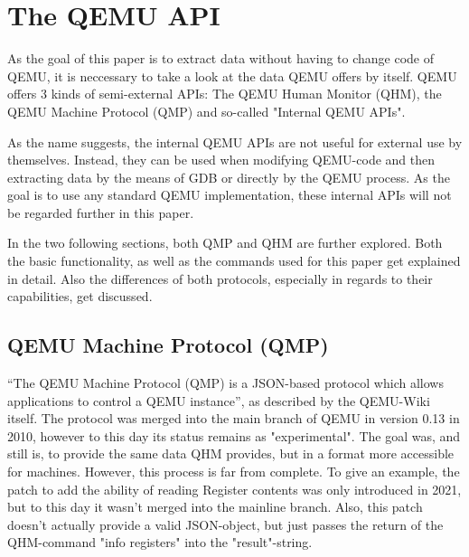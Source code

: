 
\chapter{The QEMU API} \label{chap:QEMU_API}
As the goal of this paper is to extract data without having to change code of QEMU,
it is neccessary to take a look at the data QEMU offers by itself.
QEMU offers 3 kinds of semi-external APIs: The QEMU Human Monitor (QHM),
the QEMU Machine Protocol (QMP) and so-called "Internal QEMU APIs"\cite{internal}.

As the name suggests, the internal QEMU APIs are not useful for external use by themselves.
Instead, they can be used when modifying QEMU-code and then extracting data by the means of GDB or directly by the QEMU process.
As the goal is to use any standard QEMU implementation, these internal APIs will not be regarded further in this paper.

In the two following sections, both QMP and QHM are further explored. Both the basic functionality,
as well as the commands used for this paper get explained in detail.
Also the differences of both protocols, especially in regards to their capabilities,
get discussed.

\section{QEMU Machine Protocol (QMP)} \label{sec:QMP}
\enquote{The QEMU Machine Protocol (QMP) is a JSON-based protocol which allows applications to control a QEMU instance}\cite{qmp-description}, as described by the QEMU-Wiki itself.
The protocol was merged into the main branch of QEMU in version 0.13 in 2010, however to this day its status remains as "experimental"\cite{qmp-merge}.
The goal was, and still is, to provide the same data QHM provides, but in a format more accessible for machines.
However, this process is far from complete. To give an example, the patch to add the ability of reading Register contents was only introduced in 2021,
but to this day it wasn't merged into the mainline branch.
Also, this patch doesn't actually provide a valid JSON-object, but just passes the return of the QHM-command "info registers" into the "result"-string\cite{qmp-registers-patch}.

